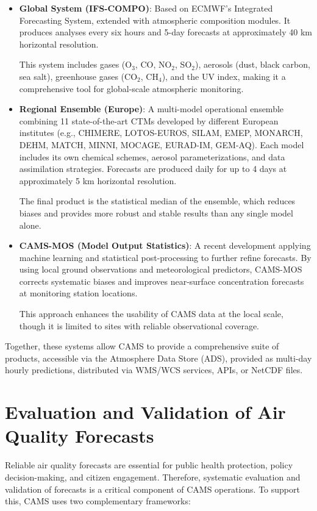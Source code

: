 \begin{itemize}
	\item \textbf{Global System (IFS-COMPO)}: Based on ECMWF’s Integrated Forecasting System, extended with atmospheric composition modules. It produces analyses every six hours and 5-day forecasts at approximately 40 km horizontal resolution. 
	
	This system includes gases (O$_3$, CO, NO$_2$, SO$_2$), aerosols (dust, black carbon, sea salt), greenhouse gases (CO$_2$, CH$_4$), and the UV index, making it a comprehensive tool for global-scale atmospheric monitoring.
	
	\item \textbf{Regional Ensemble (Europe)}: A multi-model operational ensemble combining 11 state-of-the-art CTMs developed by different European institutes (e.g., CHIMERE, LOTOS-EUROS, SILAM, EMEP, MONARCH, DEHM, MATCH, MINNI, MOCAGE, EURAD-IM, GEM-AQ). Each model includes its own chemical schemes, aerosol parameterizations, and data assimilation strategies. Forecasts are produced daily for up to 4 days at approximately 5 km horizontal resolution. 
	
	The final product is the statistical median of the ensemble, which reduces biases and provides more robust and stable results than any single model alone.
	
	\item \textbf{CAMS-MOS (Model Output Statistics)}: A recent development applying machine learning and statistical post-processing to further refine forecasts. By using local ground observations and meteorological predictors, CAMS-MOS corrects systematic biases and improves near-surface concentration forecasts at monitoring station locations. 
	
	This approach enhances the usability of CAMS data at the local scale, though it is limited to sites with reliable observational coverage.
\end{itemize}

Together, these systems allow CAMS to provide a comprehensive suite of products, accessible via the Atmosphere Data Store (ADS), provided as multi-day hourly predictions, distributed via WMS/WCS services, APIs, or NetCDF files.

\section{Evaluation and Validation of Air Quality Forecasts}
\label{sec:evaluation}

Reliable air quality forecasts are essential for public health protection, policy decision-making, and citizen engagement. Therefore, systematic evaluation and validation of forecasts is a critical component of CAMS operations. To support this, CAMS uses two complementary frameworks:

